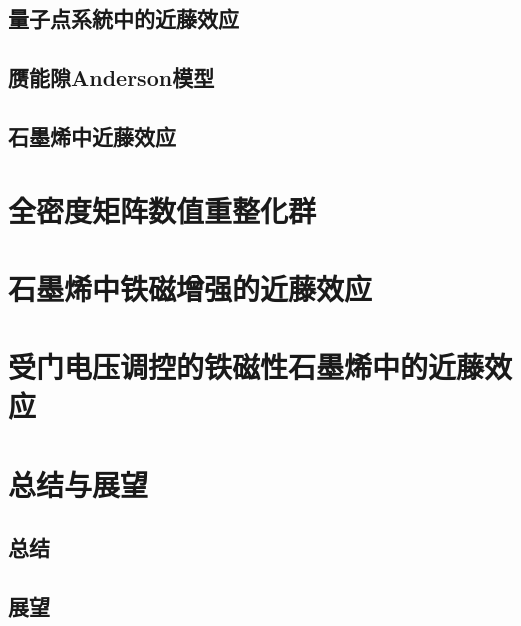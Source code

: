 \documentclass[twoside]{LZUthesis}
\begin{document}
\section{量子点系統中的近藤效应}
\section{赝能隙Anderson模型}
\section{石墨烯中近藤效应}

\chapter{全密度矩阵数值重整化群}


\chapter{石墨烯中铁磁增强的近藤效应}


\chapter{受门电压调控的铁磁性石墨烯中的近藤效应}


\chapter{总结与展望}
\section{总结}
\section{展望}




%
%
\iffalse
\renewcommand{\baselinestretch}{1}\zihao{5}\begingroup\raggedright\begin{thebibliography}{100} \makeatletter
	\bibitem{Jandl1996_7318}
	S.~Jandl, M.~Poirier, M.~Castonguay, P.~Fronzes, J.~L. Musfeldt,
	A.~Revcolevschi, and G.~Dhalenne.
	{\it Phonons in pure and doped ${\mathrm{CuGeO}}_{3}$ spin-peierls crystals: Raman and ultrasonic studies}.
	\href{https://link.aps.org/doi/10.1103/PhysRevB.54.7318} {Phys.	Rev. B \textbf{54}, 7318 (1996)}.

\end{thebibliography}
\fi
\end{document}
